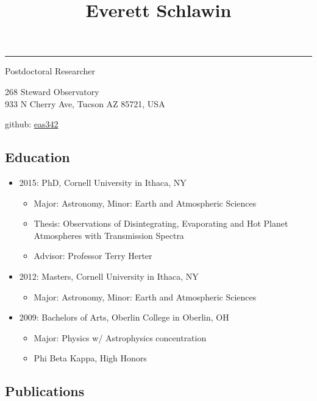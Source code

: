 \documentclass[11pt, oneside]{article}   	%
\title{Everett Schlawin}
\date{}							%
\begin{document}
\maketitle
\vspace{-0.85in}
\begin{centering}
\rule{6in}{0.03in}
Postdoctoral Researcher

268 Steward Observatory\\
933 N Cherry Ave, Tucson AZ 85721, USA

github: \href{https://github.com/eas342}{eas342}

\end{centering}

\subsection*{Education}
\begin{itemize}[noitemsep]
	\item 2015: PhD, Cornell University in Ithaca, NY
		\begin{itemize}[noitemsep]
		\item Major: Astronomy, Minor: Earth and Atmospheric Sciences
		\item Thesis: Observations of Disintegrating, Evaporating and Hot Planet Atmospheres with Transmission Spectra
		\item Advisor: Professor Terry Herter
		\end{itemize}
	\item 2012: Masters, Cornell University in Ithaca, NY
		\begin{itemize}[noitemsep]
		\item Major: Astronomy, Minor: Earth and Atmospheric Sciences
		\end{itemize}
	\item 2009: Bachelors of Arts, Oberlin College in Oberlin, OH
		\begin{itemize}[noitemsep]
		\item Major: Physics w/ Astrophysics concentration
		\item Phi Beta Kappa, High Honors
		\end{itemize}
\end{itemize}

\vspace{-0.2in}
\subsection*{Publications}
\nocite{schlawin2014,schlawin2017dhs,schlawin2017bdVar,greene2017jatisNIRCam,schlawin2017tserSpeXPipeline,greene2016slitlessGrisms,schlawin2016kic1255,schlawin2010,schlawin2016kic1255,schlawin2014TSpec,muirheadKOI961}
\begingroup
\renewcommand{\section}[2]{}%


\endgroup
\end{document}
